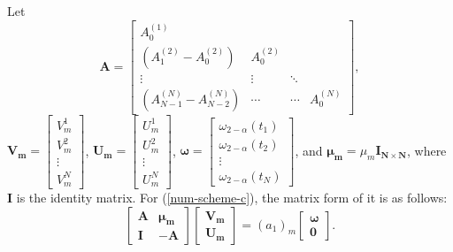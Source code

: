 \documentclass[11pt]{article}
\numberwithin{equation}{section}
\begin{document}
Let 
$$
\boldsymbol{A}=\left[
\begin{array}{cccc}
    A_0^{(1)}                      &             &          &            \\
   (A_1^{(2)}-A_0^{(2)})           &  A_0^{(2)}  &          &            \\
    \vdots                         & \vdots      & \ddots   &            \\
    (A_{N-1}^{(N)}-A_{N-2}^{(N)})  &\cdots        &\cdots   & A_0^{(N)}  
\end{array}
\right],
$$
$
\boldsymbol{V_m}=\left[
\begin{array}{c}
   V_m^1           \\
   V_m^2           \\
    \vdots         \\
   V_m^N    
\end{array}
\right]
$,
$
\boldsymbol{U_m}=\left[
\begin{array}{c}
   U_m^1           \\
   U_m^2           \\
    \vdots          \\
   U_m^N    
\end{array}
\right]
$,
$
\boldsymbol{\omega}=\left[
\begin{array}{c}
   \omega_{2-\alpha}(t_1)\\
   \omega_{2-\alpha}(t_2)\\
   \vdots\\ 
   \omega_{2-\alpha}(t_N)    
\end{array}
\right]
$,
and
$\boldsymbol{\mu_m}=\mu_m\boldsymbol{I_{N\times N}}$,
where $\boldsymbol{I}$ is the identity matrix. For (\ref{num-scheme-c}), the matrix form of it is as follows:
\begin{equation}\label{matrix-form}
\left[
\begin{array}{cc}
\boldsymbol{A} & \boldsymbol{\mu_m}\\
\boldsymbol{I} & \boldsymbol{-A}
\end{array}
\right]\left[
\begin{array}{c}
\boldsymbol{V_m} \\
\boldsymbol{U_m} 
\end{array}
\right]
=(a_1)_m\left[
\begin{array}{c}
\boldsymbol{\omega} \\
\boldsymbol{0} 
\end{array}
\right].
\end{equation}
\end{document}
